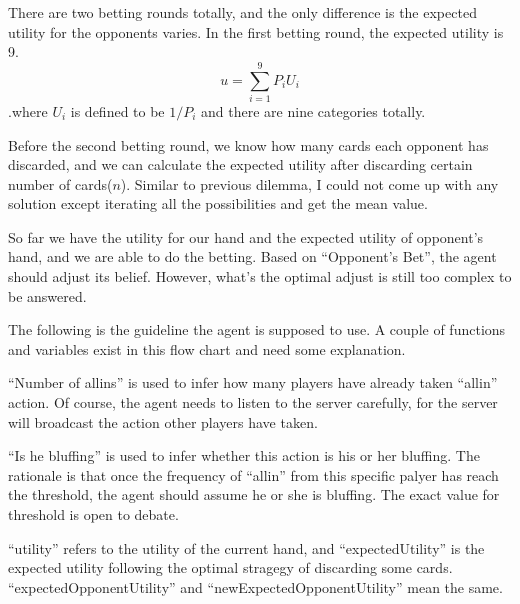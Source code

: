 \documentclass{report}
\begin{document}
There are two betting rounds totally, and the only difference is the expected utility for the opponents varies. In the first betting round, the 
expected utility is 9.
\[ u = \sum_{i=1}^{9} P_i U_i \]
.where $U_i$ is defined to be $1/P_i$ and there are nine categories totally.

Before the second betting round, we know how many cards each opponent has discarded, and we can calculate the expected utility after discarding 
certain number of cards($n$). Similar to previous dilemma, I could not come up with any solution except iterating all the possibilities and get the 
mean value.

So far we have the utility for our hand and the expected utility of opponent's hand, and we are able to do the betting. Based on ``Opponent's Bet'', 
the agent should adjust its belief. However, what's the optimal adjust is still too complex to be answered.

The following is the guideline the agent is supposed to use. A couple of functions and variables exist in this flow chart and need some explanation. 

``Number of allins'' is used to infer how many players have already taken ``allin'' action. Of course, the agent needs to listen to the server 
carefully, for the server will broadcast the action other players have taken. 

``Is he bluffing'' is used to infer whether this action is his or her bluffing. The rationale is that once the frequency of ``allin'' from this 
specific palyer has reach the threshold, the agent should assume he or she is bluffing. The exact value for threshold is open to debate.

``utility'' refers to the utility of the current hand, and ``expectedUtility'' is the expected utility following the optimal stragegy of discarding 
some cards. ``expectedOpponentUtility'' and ``newExpectedOpponentUtility'' mean the same.
\end{document}
